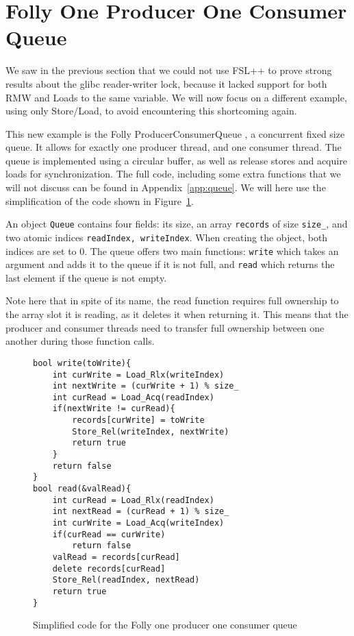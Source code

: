 \section{Folly One Producer One Consumer Queue}

We saw in the previous section that we could not use FSL++ to prove strong results about the glibc reader-writer lock, because it lacked support for both RMW and Loads to the same variable. We will now focus on a different example, using only Store/Load, to avoid encountering this shortcoming again.

This new example is the Folly ProducerConsumerQueue \cite{queue}, a concurrent fixed size queue. It allows for exactly one producer thread, and one consumer thread. The queue is implemented using a circular buffer, as well as release stores and acquire loads for synchronization. The full code, including some extra functions that we will not discuss can be found in Appendix~\ref{app:queue}. We will here use the simplification of the code shown in Figure~\ref{fig:queueCyclic}.

An object \texttt{Queue} contains four fields: its size, an array \texttt{records} of size \texttt{size\_}, and two atomic indices \texttt{readIndex, writeIndex}. When creating the object, both indices are set to $0$. The queue offers two main functions: \texttt{write} which takes an argument and adds it to the queue if it is not full, and \texttt{read} which returns the last element if the queue is not empty. 

Note here that in spite of its name, the read function requires full ownership to the array slot it is reading, as it deletes it when returning it. This means that the producer and consumer threads need to transfer full ownership between one another during those function calls.

\begin{figure}
\begin{lstlisting}
bool write(toWrite){
	int curWrite = Load_Rlx(writeIndex)
	int nextWrite = (curWrite + 1) % size_
	int curRead = Load_Acq(readIndex)
	if(nextWrite != curRead){
		records[curWrite] = toWrite
		Store_Rel(writeIndex, nextWrite)
		return true
	}
	return false
}
bool read(&valRead){
	int curRead = Load_Rlx(readIndex)
	int nextRead = (curRead + 1) % size_
	int curWrite = Load_Acq(writeIndex)
	if(curRead == curWrite)
		return false
	valRead = records[curRead]
	delete records[curRead]
	Store_Rel(readIndex, nextRead)
	return true
}

\end{lstlisting}
		\caption{Simplified code for the Folly one producer one consumer queue}
		\label{fig:queueCyclic}
\end{figure}

